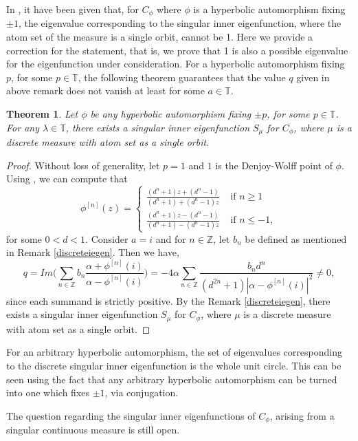 \documentclass[12pt, reqno]{amsart}
\newtheorem{theorem}{Theorem}[section]
\theoremstyle{definition}
\numberwithin{equation}{section}
\begin{document}
In \cite[Page~246, 247]{matachenum}, it have been given that, for $C_\phi$ where $\phi$ is a hyperbolic automorphism fixing $\pm1$, the eigenvalue corresponding to the singular inner eigenfunction, where the atom set of the measure is a single orbit, cannot be 1. Here we provide a correction for the statement, that is, we prove that 1 is also a possible eigenvalue for the eigenfunction under consideration.
 For a hyperbolic automorphism fixing $p$, for some $p\in \mathbb{T}$, the following theorem guarantees that the value $q$ given in above remark does not vanish at least for some $a \in \mathbb{T}$.
\begin{theorem}
	Let $\phi$ be any hyperbolic automorphism  fixing $\pm p$, for some $p\in \mathbb{T}$. For any $\lambda \in \mathbb{T}$, there exists a singular inner  eigenfunction  $S_\mu$ for $C_\phi$, where $\mu$ is a discrete measure with atom set as a single orbit.
\end{theorem}
\begin{proof}
Without loss of generality, let $p=1$  and $1$ is the Denjoy-Wolff point of $\phi$.	Using   \cite[Lemma 5.4.8]{texthardy}, we can compute that
	$$\phi^{[n]}(z)=\begin{cases}
		
		\frac{(d^n+1)z+(d^{n}-1)}{(d^n+1)+(d^{n}-1)z}&\text{ if } n\geq 1 \\
		\frac{(d^n+1)z-(d^{n}-1)}{(d^n+1)-(d^{n}-1)z}& \text{ if } n \leq -1,
		
	\end{cases}
	$$ for some $0<d<1$.
	Consider $a=i$ and for $n \in \mathbb{Z}$, let $b_n$ be defined as mentioned in Remark \ref{discreteiegen}.
	Then we have,
	$$q=Im\Big(\sum\limits_{n \in\mathbb{Z}}b_n\frac{\alpha+\phi^{[n]}(i)}{\alpha-\phi^{[n]}(i)}\Big)=-4\alpha\sum\limits_{n \in\mathbb{Z}}\frac{b_n d^n}{(d^{2n}+1)|\alpha-\phi^{[n]}(i)|^2}\neq 0,$$
	since each summand is strictly positive. By the Remark \ref{discreteiegen}, there exists a singular inner  eigenfunction  $S_\mu$ for $C_\phi$, where $\mu$ is a discrete measure with atom set as a single orbit.
\end{proof}



	   For an arbitrary hyperbolic automorphism, the set of eigenvalues corresponding to the discrete singular inner eigenfunction is the whole unit circle. This can be seen using the fact that any arbitrary hyperbolic automorphism can be turned into one which fixes $\pm 1$, via conjugation.
	   
	   The question regarding the singular inner eigenfunctions of $C_\phi$, arising from a singular continuous measure is still open.
	 
\end{document}
